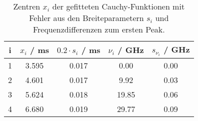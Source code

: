 \begin{table}[H]
\caption{Zentren $x_i$ der gefitteten Cauchy-Funktionen mit Fehler aus den Breiteparametern $s_i$ und Frequenzdifferenzen zum ersten Peak. }
\begin{center}
\begin{tabular}{|c|c|c|c|c|}
  \hline
  i & $x_i$ / ms & $0.2 \cdot s_i$ / ms & $\nu_i$ / GHz & $s_{\nu_i}$ / GHz \\ \hline
  1 & 3.595 & 0.017 & 0.00 & 0.00 \\ \hline
  2 & 4.601 & 0.017 & 9.92 & 0.03 \\ \hline
  3 & 5.624 & 0.018 & 19.85 & 0.06 \\ \hline
  4 & 6.680 & 0.019 & 29.77 & 0.09 \\ \hline
\end{tabular}
\end{center}
\label{tab:etalon:calib:down}
\end{table}

